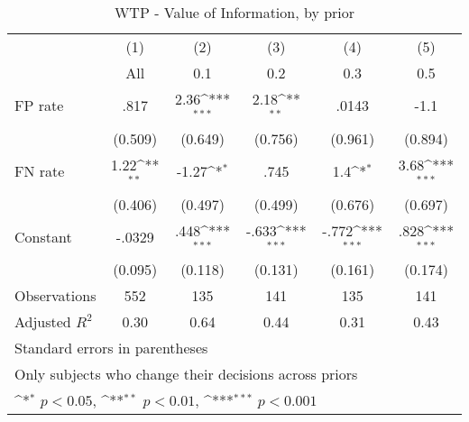 \begin{table}[htbp]\centering
\def\sym#1{\ifmmode^{#1}\else\(^{#1}\)\fi}
\caption{WTP - Value of Information, by prior}
\begin{tabular}{l*{5}{c}}
\hline\hline
                &\multicolumn{1}{c}{(1)}&\multicolumn{1}{c}{(2)}&\multicolumn{1}{c}{(3)}&\multicolumn{1}{c}{(4)}&\multicolumn{1}{c}{(5)}\\
                &\multicolumn{1}{c}{All}&\multicolumn{1}{c}{0.1}&\multicolumn{1}{c}{0.2}&\multicolumn{1}{c}{0.3}&\multicolumn{1}{c}{0.5}\\
\hline
FP rate         &     .817         &     2.36\sym{***}&     2.18\sym{**} &    .0143         &     -1.1         \\
                &  (0.509)         &  (0.649)         &  (0.756)         &  (0.961)         &  (0.894)         \\
FN rate         &     1.22\sym{**} &    -1.27\sym{*}  &     .745         &      1.4\sym{*}  &     3.68\sym{***}\\
                &  (0.406)         &  (0.497)         &  (0.499)         &  (0.676)         &  (0.697)         \\
Constant        &   -.0329         &     .448\sym{***}&    -.633\sym{***}&    -.772\sym{***}&     .828\sym{***}\\
                &  (0.095)         &  (0.118)         &  (0.131)         &  (0.161)         &  (0.174)         \\
\hline
Observations    &      552         &      135         &      141         &      135         &      141         \\
Adjusted \(R^{2}\)&     0.30         &     0.64         &     0.44         &     0.31         &     0.43         \\
\hline\hline
\multicolumn{6}{l}{\footnotesize Standard errors in parentheses}\\
\multicolumn{6}{l}{\footnotesize Only subjects who change their decisions across priors}\\
\multicolumn{6}{l}{\footnotesize \sym{*} \(p<0.05\), \sym{**} \(p<0.01\), \sym{***} \(p<0.001\)}\\
\end{tabular}
\end{table}
